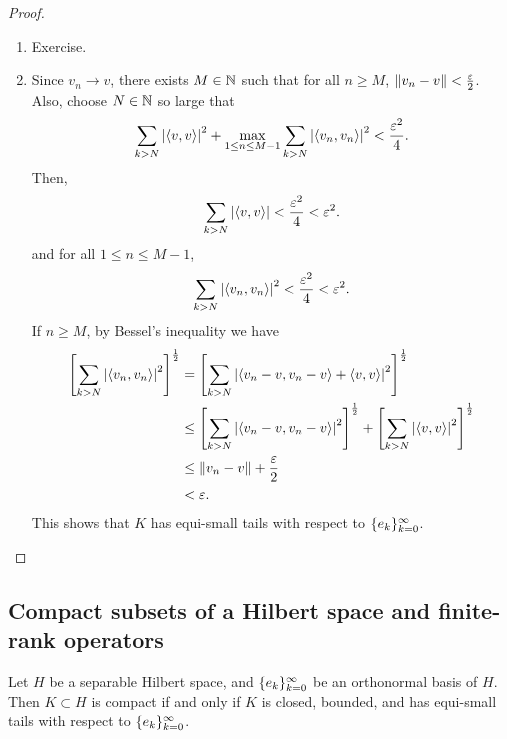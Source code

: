 \documentclass[a4paper]{article}
\renewcommand{\braket}[2]{\left\langle #1, #1 \right\rangle}
\begin{document}
\begin{proof}
\begin{enumerate}
  \item Exercise.
  
  \item Since $v_n \to v$, there exists 
  $M \in \mathbb{N}$ such that for all $n \geq M$, 
  $\left\lVert v_n - v\right\rVert < \frac{\varepsilon}{2}$. Also, choose 
  $N \in \mathbb{N}$ so large that 
  \[
  \sum_{k > N} \abs{\braket{v}{e_n}}^2 
  + \max_{1 \leq n \leq M - 1} \sum_{k > N} 
  \abs{\braket{v_n}{e_k}}^2 < \frac{\epsilon^2}{4}.
  \]
  Then, 
  \[
  \sum_{k > N} \abs{\braket{v}{e_n}} < \frac{\epsilon^2}{4}
  < \epsilon^2.
  \]
  and for all $1 \leq n \leq M - 1$, 
  \[
  \sum_{k > N} \abs{\braket{v_n}{e_k}}^2 < \frac{\epsilon^2}{4} 
  < \epsilon^2.
  \]
  If $n \geq M$, by Bessel's inequality we have 
  \[
  \begin{aligned}
    \left[ \sum_{k > N} \abs{\braket{v_n}{e_k}}^2 \right]^{\frac{1}{2}}
    & = \left[ \sum_{k > N} \abs{\braket{v_n - v}{e_k} + \braket{v}{e_k}}^2 
    \right]^{\frac{1}{2}} \\
    & \leq 
    \left[ \sum_{k > N} \abs{\braket{v_n - v}{e_k}}^2 \right]^{\frac{1}{2}} 
    + \left[ \sum_{k > N} \abs{\braket{v}{e_k}}^2  \right]^{\frac{1}{2}} \\ 
    & \leq \norm{v_n - v} + \frac{\epsilon}{2} \\
    &< \epsilon.
  \end{aligned}
  \]
  This shows that $K$ has equi-small tails with respect 
  to $\{ e_k \}_{k=0}^\infty$.
\end{enumerate}
\end{proof}

\subsection{Compact subsets of a Hilbert space and 
finite-rank operators} 

\begin{thm}
Let $H$ be a separable Hilbert space, and 
$\{ e_k \}_{k=0}^\infty$ be an orthonormal basis of $H$. 
Then $K \subset H$ is compact if and only if 
$K$ is closed, bounded, and has equi-small tails 
with respect to $\{ e_k \}_{k=0}^\infty$.
\end{thm}
\end{document}
